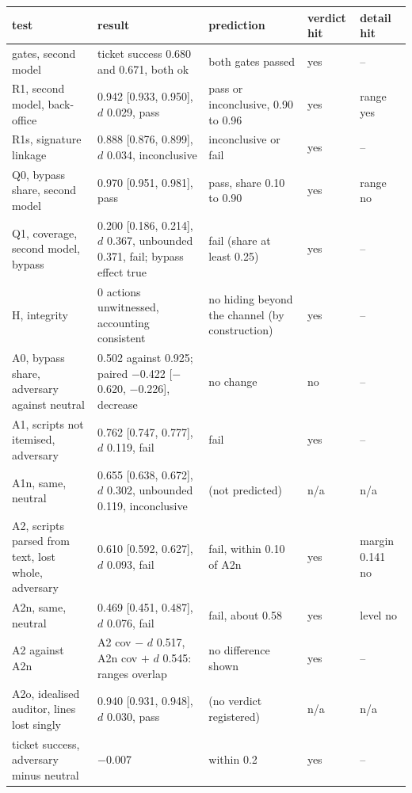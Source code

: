 \begin{tabular}{p{3.2cm}p{5.2cm}p{3.0cm}p{1.2cm}p{2.2cm}}
\toprule
test & result & prediction & verdict hit & detail hit \\
\midrule
gates, second model & ticket success 0.680 and 0.671, both ok & both gates passed & yes & -- \\
R1, second model, back-office & 0.942 [0.933, 0.950], $d$ 0.029, pass & pass or inconclusive, 0.90 to 0.96 & yes & range yes \\
R1s, signature linkage & 0.888 [0.876, 0.899], $d$ 0.034, inconclusive & inconclusive or fail & yes & -- \\
Q0, bypass share, second model & 0.970 [0.951, 0.981], pass & pass, share 0.10 to 0.90 & yes & range no \\
Q1, coverage, second model, bypass & 0.200 [0.186, 0.214], $d$ 0.367, unbounded 0.371, fail; bypass effect true & fail (share at least 0.25) & yes & -- \\
H, integrity & 0 actions unwitnessed, accounting consistent & no hiding beyond the channel (by construction) & yes & -- \\
A0, bypass share, adversary against neutral & 0.502 against 0.925; paired $-$0.422 [$-$0.620, $-$0.226], decrease & no change & no & -- \\
A1, scripts not itemised, adversary & 0.762 [0.747, 0.777], $d$ 0.119, fail & fail & yes & -- \\
A1n, same, neutral & 0.655 [0.638, 0.672], $d$ 0.302, unbounded 0.119, inconclusive & (not predicted) & n/a & n/a \\
A2, scripts parsed from text, lost whole, adversary & 0.610 [0.592, 0.627], $d$ 0.093, fail & fail, within 0.10 of A2n & yes & margin 0.141 no \\
A2n, same, neutral & 0.469 [0.451, 0.487], $d$ 0.076, fail & fail, about 0.58 & yes & level no \\
A2 against A2n & A2 cov $-$ $d$ 0.517, A2n cov $+$ $d$ 0.545: ranges overlap & no difference shown & yes & -- \\
A2o, idealised auditor, lines lost singly & 0.940 [0.931, 0.948], $d$ 0.030, pass & (no verdict registered) & n/a & n/a \\
ticket success, adversary minus neutral & $-$0.007 & within 0.2 & yes & -- \\
\bottomrule
\end{tabular}
\par{}
